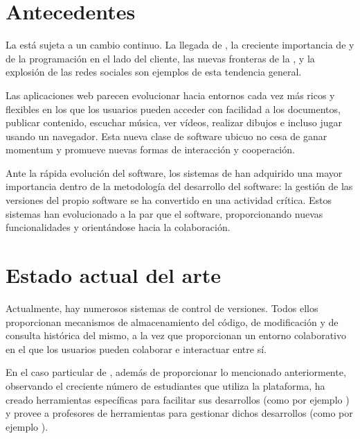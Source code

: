 
\section{Antecedentes}
\label{1:sec:1}

La \ceit{\ref{apend1:www}} está sujeta a un cambio continuo. La llegada de \ceit{\ref{apend1:html}}, la creciente importancia de \ceit{\ref{apend1:ajax}} y de la programación en el lado del cliente, las nuevas fronteras de la \ceit{\ref{apend1:web}}, y la explosión de las redes sociales son ejemplos de esta tendencia general.
\bigskip

Las aplicaciones web parecen evolucionar hacia entornos cada vez más ricos y flexibles en los que
los usuarios pueden acceder con facilidad a los documentos, publicar contenido, escuchar música, ver
vídeos, realizar dibujos e incluso jugar usando un navegador. Esta nueva clase de software ubicuo no
cesa de ganar momentum y promueve nuevas formas de interacción y cooperación.
\bigskip


Ante la rápida evolución del software, los sistemas de \ceis{\ref{apend1:cvs}} han adquirido una mayor importancia dentro de la metodología del desarrollo del software: la gestión de las versiones del propio software se ha convertido en una actividad crítica. Estos sistemas han evolucionado a la par que el software, proporcionando nuevas funcionalidades y orientándose hacia la colaboración.

\section{Estado actual del arte}
\label{1:sec:2}

Actualmente, hay numerosos sistemas de control de versiones. Todos ellos proporcionan mecanismos de almacenamiento del código, de modificación y de consulta histórica del mismo, a la vez que proporcionan un entorno colaborativo en el que los usuarios pueden colaborar e interactuar entre sí.

En el caso particular de \ceis{\ref{apend1:github}}, además de proporcionar lo mencionado anteriormente, observando el creciente número de estudiantes que utiliza la plataforma, ha creado herramientas específicas para facilitar sus desarrollos (como por ejemplo \ceit{\ref{apend1:sdp}}) y provee a profesores de herramientas para gestionar dichos desarrollos (como por ejemplo \ceit{\ref{apend1:github-classroom}}).

